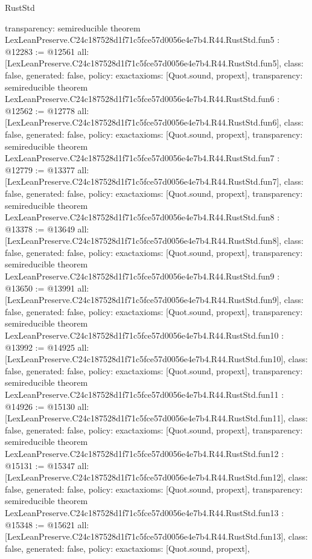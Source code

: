 \begin{lexlean}{RustStd}
\begin{coremodule}
{  transparency: semireducible
}
theorem LexLeanPreserve.C24c187528d1f71c5fce57d0056e4e7b4.R44.RustStd.fun5 : @12283 := @12561 {
  all: [LexLeanPreserve.C24c187528d1f71c5fce57d0056e4e7b4.R44.RustStd.fun5],
  class: false,
  generated: false,
  policy: exact{axioms: [Quot.sound, propext]},
  transparency: semireducible
}
theorem LexLeanPreserve.C24c187528d1f71c5fce57d0056e4e7b4.R44.RustStd.fun6 : @12562 := @12778 {
  all: [LexLeanPreserve.C24c187528d1f71c5fce57d0056e4e7b4.R44.RustStd.fun6],
  class: false,
  generated: false,
  policy: exact{axioms: [Quot.sound, propext]},
  transparency: semireducible
}
theorem LexLeanPreserve.C24c187528d1f71c5fce57d0056e4e7b4.R44.RustStd.fun7 : @12779 := @13377 {
  all: [LexLeanPreserve.C24c187528d1f71c5fce57d0056e4e7b4.R44.RustStd.fun7],
  class: false,
  generated: false,
  policy: exact{axioms: [Quot.sound, propext]},
  transparency: semireducible
}
theorem LexLeanPreserve.C24c187528d1f71c5fce57d0056e4e7b4.R44.RustStd.fun8 : @13378 := @13649 {
  all: [LexLeanPreserve.C24c187528d1f71c5fce57d0056e4e7b4.R44.RustStd.fun8],
  class: false,
  generated: false,
  policy: exact{axioms: [Quot.sound, propext]},
  transparency: semireducible
}
theorem LexLeanPreserve.C24c187528d1f71c5fce57d0056e4e7b4.R44.RustStd.fun9 : @13650 := @13991 {
  all: [LexLeanPreserve.C24c187528d1f71c5fce57d0056e4e7b4.R44.RustStd.fun9],
  class: false,
  generated: false,
  policy: exact{axioms: [Quot.sound, propext]},
  transparency: semireducible
}
theorem LexLeanPreserve.C24c187528d1f71c5fce57d0056e4e7b4.R44.RustStd.fun10 : @13992 := @14925 {
  all: [LexLeanPreserve.C24c187528d1f71c5fce57d0056e4e7b4.R44.RustStd.fun10],
  class: false,
  generated: false,
  policy: exact{axioms: [Quot.sound, propext]},
  transparency: semireducible
}
theorem LexLeanPreserve.C24c187528d1f71c5fce57d0056e4e7b4.R44.RustStd.fun11 : @14926 := @15130 {
  all: [LexLeanPreserve.C24c187528d1f71c5fce57d0056e4e7b4.R44.RustStd.fun11],
  class: false,
  generated: false,
  policy: exact{axioms: [Quot.sound, propext]},
  transparency: semireducible
}
theorem LexLeanPreserve.C24c187528d1f71c5fce57d0056e4e7b4.R44.RustStd.fun12 : @15131 := @15347 {
  all: [LexLeanPreserve.C24c187528d1f71c5fce57d0056e4e7b4.R44.RustStd.fun12],
  class: false,
  generated: false,
  policy: exact{axioms: [Quot.sound, propext]},
  transparency: semireducible
}
theorem LexLeanPreserve.C24c187528d1f71c5fce57d0056e4e7b4.R44.RustStd.fun13 : @15348 := @15621 {
  all: [LexLeanPreserve.C24c187528d1f71c5fce57d0056e4e7b4.R44.RustStd.fun13],
  class: false,
  generated: false,
  policy: exact{axioms: [Quot.sound, propext]},
}
\end{coremodule}
\end{lexlean}
